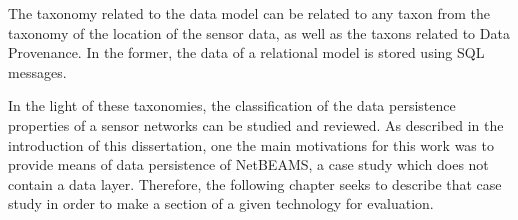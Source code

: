 The taxonomy related to the data model can be related to any taxon from the
taxonomy of the location of the sensor data, as well as the taxons related to
Data Provenance. In the former, the data of a relational model is stored using
SQL messages.

In the light of these taxonomies, the classification of the data persistence
properties of a sensor networks can be studied and reviewed. As described in
the introduction of this dissertation, one the main motivations for this work
was to provide means of data persistence of NetBEAMS, a case study which does
not contain a data layer. Therefore, the following chapter seeks to describe
that case study in order to make a section of a given technology for evaluation.
